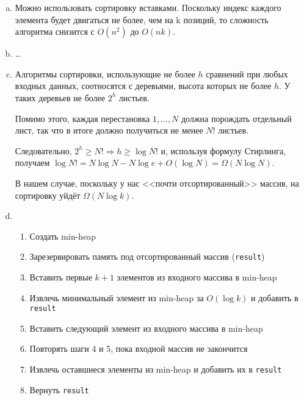 \begin{solution}
    \medskip\noindent

    \begin{enumerate}[a)]
        \item
            Можно использовать сортировку вставками. Поскольку индекс каждого элемента будет двигаться
            не более, чем на k позиций, то сложность алгоритма снизится с $O(n^2)$ до $O(nk)$.

        \item
            \dots

        \item
            Алгоритмы сортировки, использующие не более $h$ сравнений при любых входных данных, соотносятся
            с деревьями, высота которых не более $h$. У таких деревьев не более $2^h$ листьев.

            Помимо этого, каждая перестановка $1,\dots,N$ должна порождать отдельный лист, так что
            в итоге должно получиться не менее $N!$ листьев.

            Следовательно, $2^h \ge N! \Rightarrow h \ge \log{N!}$ и, используя формулу Стирлинга, получаем
            $\log{N!} = N \log N - N \log e + O(\log N) = \Omega(N \log N)$.

            В нашем случае, поскольку у нас <<почти отсортированный>> массив, на сортировку уйдёт $\Omega(N \log k)$.

        \item
            \begin{enumerate}[1.]
                \item Создать min-heap
                \item Зарезервировать память под отсортированный массив (\texttt{result})
                \item Вставить первые $k + 1$ элементов из входного массива в min-heap
                \item Извлечь минимальный элемент из min-heap за $O(\log k)$ и добавить в \texttt{result}
                \item Вставить следующий элемент из входного массива в min-heap
                \item Повторять шаги 4 и 5, пока входной массив не закончится
                \item Извлечь оставшиеся элементы из min-heap и добавить их в \texttt{result}
                \item Вернуть \texttt{result}
            \end{enumerate}
    \end{enumerate}
\end{solution}


